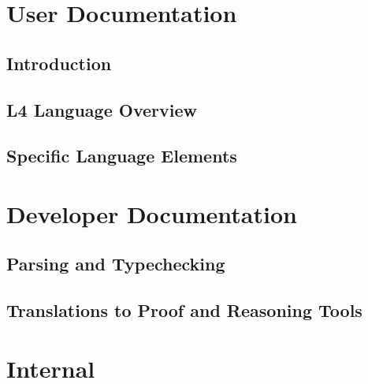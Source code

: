 \documentclass[11pt,a4paper,twoside,headinclude,footexclude]{scrreprt}
\begin{document}




\cleardoublepage


\newpage
\tableofcontents
\listoffigures

\cleardoublepage


\chapter{User Documentation}

\section{Introduction}\label{sec:introduction}



\section{L4 Language Overview}\label{sec:language}


\section{Specific Language Elements}\label{sec:language_elements}


\chapter{Developer Documentation}

\section{Parsing and Typechecking}\label{sec:parsing_typechecking}



\section{Translations to Proof and Reasoning Tools}\label{sec:translations}


\chapter{Internal}





\newpage


\end{document}
